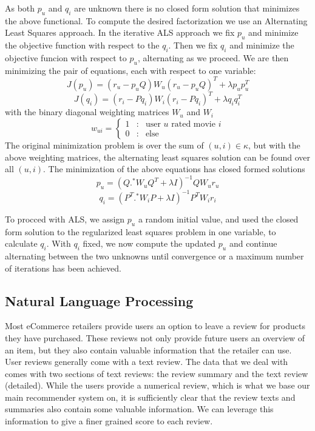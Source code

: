 \documentclass{article} %
\begin{document}
As both $p_u$ and $q_i$  are unknown there is no closed form solution that minimizes the above functional. To compute the desired factorization we use an Alternating Least Squares approach. In the iterative ALS approach we fix $p_u$ and minimize the objective function with respect to the $q_i$. Then we fix $q_i$ and minimize the objective funcion with respect to $p_u$, alternating as we proceed. We are then minimizing the pair of equations, each with respect to one variable: 
\[ J(p_u) = (r_u - p_u Q) W_u (r_u - p_u Q)^T + \lambda p_u p_u^T \] 
\[ J(q_i) = (r_i - P q_i) W_i (r_i - P q_i)^T + \lambda q_i q_i^T \]
with the binary diagonal weighting matrices $W_u$ and $W_i$ 
\[
   w_{ui} = \left\{
     \begin{array}{lll}
       1 &: &\text{user } u \text{ rated movie } i \\
       0 &: &\text{else}
     \end{array}
   \right.
\]
The original minimization problem is over the sum of $(u,i) \in \kappa$, but with the above weighting matrices, the alternating least squares solution can be found over all $(u,i)$. The minimization of the above equations has closed formed solutions
\[ p_u = (Q .^* W_u Q^T + \lambda I)^{-1} Q W_u r_u \] 
\[ q_i = (P^T .^* W_i P + \lambda I)^{-1} P^T W_i r_i \] 

To procced with ALS, we assign $p_u$ a random initial value, and used the closed form solution to the regularized least squares problem in one variable, to calculate $q_i$. With $q_i$ fixed, we now compute the updated $p_u$ and continue alternating between the two unknowns until convergence or a maximum number of iterations has been achieved. 


\subsection{Natural Language Processing}

Most eCommerce retailers provide users an option to leave a review for products they have purchased. These reviews not only provide future users an overview of an item, but they also contain valuable information that the retailer can use. User reviews generally come with a text review. The data that we deal with comes with two sections of text reviews: the review summary and the text review (detailed). While the users provide a numerical review, which is what we base our main recommender system on, it is sufficiently clear that the review texts and summaries also contain some valuable information. We can  leverage this information to give a finer grained score to each review. 
\end{document}
